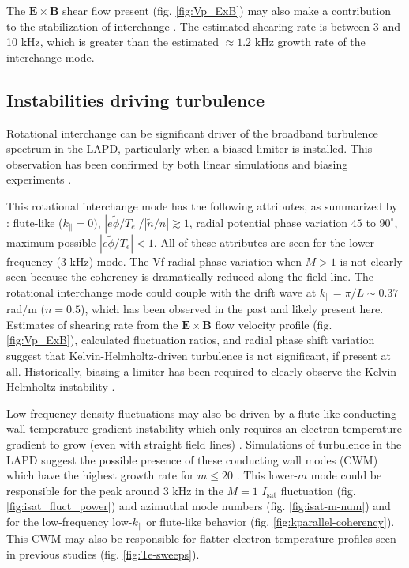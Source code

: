 The $\boldsymbol{E \times B}$ shear flow present (fig. \ref{fig:Vp_ExB}) may also make a contribution to the stabilization of interchange \cite{Ryutov_2011,Bagryansky_2003,Bagryansky_2007,Beklemishev_2010}. The estimated shearing rate is between 3 and 10 kHz, which is greater than the estimated $\approx 1.2$ kHz growth rate of the interchange mode.

\subsection{Instabilities driving turbulence}

Rotational interchange can be significant driver of the broadband turbulence spectrum in the LAPD, particularly when a biased limiter is installed. This observation has been confirmed by both linear simulations \cite{Popovich_2010} and biasing experiments \cite{Schaffner_2013}. 

This rotational interchange mode has the following attributes, as summarized by \cite{Jassby_transverse_1972}: flute-like ($k_\parallel=0)$, $|e\tilde{\phi}/T_e|/|\tilde{n}/n| \gtrsim 1$, radial potential phase variation $45$ to $90^\circ$, maximum possible $|e\tilde{\phi}/T_e| < 1$. All of these attributes are seen for the lower frequency (3 kHz) mode. The Vf radial phase variation when $M>1$ is not clearly seen because the coherency is dramatically reduced along the field line.
The rotational interchange mode could couple with the drift wave at $k_\parallel = \pi / L \sim 0.37$ rad/m ($n=0.5$), which has been observed in the past \cite{Schaffner_2013} and likely present here.
Estimates of shearing rate from the $\boldsymbol{E \times B}$ flow velocity profile (fig. \ref{fig:Vp_ExB}), calculated fluctuation ratios, and radial phase shift variation suggest that Kelvin-Helmholtz-driven turbulence is not significant, if present at all. Historically, biasing a limiter has been required to clearly observe the Kelvin-Helmholtz instability \cite{horton_vorticity_2005, Schaffner_2012, Schaffner_2013}.

Low frequency density fluctuations may also be driven by a flute-like conducting-wall temperature-gradient instability which only requires an electron temperature gradient to grow (even with straight field lines) \cite{Berk_1991}. Simulations of turbulence in the LAPD suggest the possible presence of these conducting wall modes (CWM) which have the highest growth rate for $m \leq 20$ \cite{Friedman_2013}. This lower-$m$ mode could be responsible for the peak around $3$ kHz in the $M=1$ $I_\text{sat}$ fluctuation (fig. \ref{fig:isat_fluct_power}) and azimuthal mode numbers (fig. \ref{fig:isat-m-num}) and for the low-frequency low-$k_\parallel$ or flute-like behavior (fig. \ref{fig:kparallel-coherency}). This CWM may also be responsible for flatter electron temperature profiles seen in previous studies \cite{Perks_impact_2022, Schaffner_2013} (fig. \ref{fig:Te-sweeps}). 

